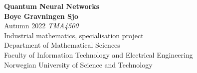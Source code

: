 \begin{titlepage}
    \begin{center}
        \vspace*{1cm}
        \Huge
        \textbf{
            Quantum Neural Networks}\\

        \large
        \vspace{1.5cm}
        \textbf{Boye Gravningen Sjo}\\
        \vspace{0.5cm}
        Autumn 2022
        \vspace{0.5cm}
        \vfill
        \textit{TMA4500} \\[0.3cm]
        Industrial mathematics, specialisation project \\[0.3cm]
        Department of Mathematical Sciences \\[0.3cm]
        Faculty of Information Technology and Electrical Engineering \\[0.3cm]
        Norwegian University of Science and Technology
    \end{center}
\end{titlepage}
\thispagestyle{empty}
\cleardoublepage